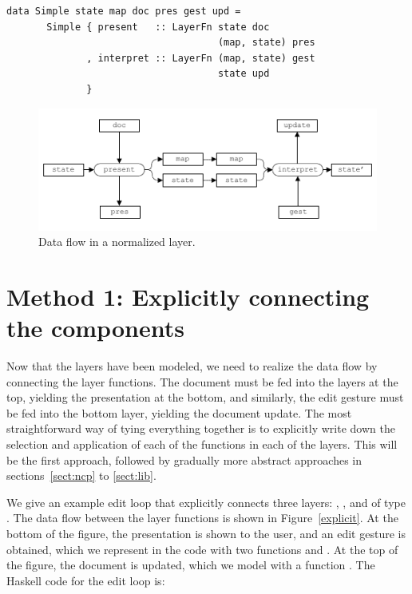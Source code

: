 \documentclass[preprint,natbib]{sigplanconf}
\begin{document}
\begin{small}
\begin{verbatim}
data Simple state map doc pres gest upd =
       Simple { present   :: LayerFn state doc 
                                     (map, state) pres
              , interpret :: LayerFn (map, state) gest
                                     state upd
              }
\end{verbatim}
\end{small}

\begin{figure}
\includegraphics[width=\columnwidth]{images/NormalizedLayer}
\caption{Data flow in a normalized layer.}\label{wrapped} 
\end{figure}



%																
%																
%																
\section{Method 1: Explicitly connecting the components} \label{sect:simple}

Now that the layers have been modeled, we need to realize the data flow by connecting the layer functions. The document must be fed into the layers at the top, yielding the presentation at the bottom, and similarly, the edit gesture must be fed into the bottom layer, yielding the document update. The most straightforward way of tying everything together is to explicitly write down the selection and application of each of the functions in each of the layers. This will be the first approach, followed by gradually more abstract approaches in sections~\ref{sect:ncp} to \ref{sect:lib}.

We give an example edit loop that explicitly connects three layers: , , and  of type . The data flow between the layer functions is shown in Figure~\ref{explicit}. At the bottom of the figure, the presentation is shown to the user, and an edit gesture is obtained, which we represent in the code with two functions  and . At the top of the figure, the document is updated, which we model with a function . The Haskell code for the edit loop is: 
\end{document}
